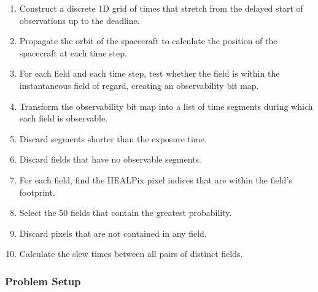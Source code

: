 \documentclass[twocolumn,times]{aastex631}
\begin{document}
\begin{enumerate}
    \item Construct a discrete 1D grid of times that stretch from the delayed start of observations up to the deadline.
    \item Propagate the orbit of the spacecraft to calculate the position of the spacecraft at each time step.
    \item For each field and each time step, test whether the field is within the instantaneous field of regard, creating an observability bit map.
    \item Transform the observability bit map into a list of time segments during which each field is observable.
    \item Discard segments shorter than the exposure time.
    \item Discard fields that have no observable segments.
    \item For each field, find the \ac{HEALPix} pixel indices that are within the field's footprint.
    \item Select the 50 fields that contain the greatest probability.
    \item Discard pixels that are not contained in any field.
    \item Calculate the slew times between all pairs of distinct fields.
\end{enumerate}

\subsubsection{Problem Setup}
\end{document}
